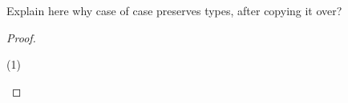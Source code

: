 Explain here why case of case preserves types, after copying it over?

\CaseOfCaseTheorem

\begin{proof}~

\begin{tabbing}
    (1) $$\\
\end{tabbing}
\end{proof}



